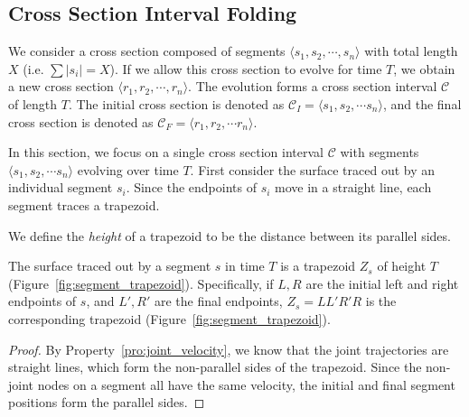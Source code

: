 \subsection{Cross Section Interval Folding}
\label{sec:interval_folding}

\begin{definition}
\label{def:interval}
We consider a cross section composed of segments $ \langle s_1,s_2,\cdots,s_n \rangle$
with total length $X$ (i.e. $\sum \left| s_i\right| = X$).
If we allow this cross section to evolve for time $T$, we obtain a new cross section $\langle r_1,r_2,\cdots ,r_n \rangle$.
The evolution forms a cross section interval $\mathcal C$ of length $T$.
The initial cross section is denoted as $\mathcal C_I = \langle s_1, s_2,\cdots s_n \rangle$,
and the final cross section is denoted as $\mathcal C_F = \langle r_1, r_2,\cdots r_n \rangle$.
\end{definition}



In this section, we focus on a single cross section interval $\mathcal C$ with segments $\langle s_1, s_2,\cdots s_n \rangle$ evolving over time $T$.
First consider the surface traced out by an individual segment $s_i$.
Since the endpoints of $s_i$ move in a straight line, each segment traces a trapezoid.

We define the \emph{height} of a trapezoid to be the distance between its parallel sides.

\begin{lemma}
\label{lem:trapezoid}
The surface traced out by a segment $s$ in time $T$ is a trapezoid $Z_s$ of height $T$ (Figure~\ref{fig:segment_trapezoid}).
Specifically, if $L,R$ are the initial left and right endpoints of $s$, and $L',R'$ are the final endpoints,
$Z_s = LL'R'R$ is the corresponding trapezoid (Figure~\ref{fig:segment_trapezoid}).
\end{lemma}
\begin{proof}
By Property~\ref{pro:joint_velocity}, we know that the joint trajectories are straight lines, which form the non-parallel sides of the trapezoid.
Since the non-joint nodes on a segment all have the same velocity, the initial and final segment positions form the parallel sides.
\end{proof}

